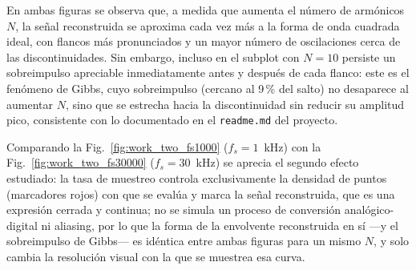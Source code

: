 En ambas figuras se observa que, a medida que aumenta el número de armónicos $N$, la señal reconstruida se aproxima cada vez más a la forma de onda cuadrada ideal, con flancos más pronunciados y un mayor número de oscilaciones cerca de las discontinuidades. Sin embargo, incluso en el subplot con $N = 10$ persiste un sobreimpulso apreciable inmediatamente antes y después de cada flanco: este es el fenómeno de Gibbs, cuyo sobreimpulso (cercano al 9\,\% del salto) no desaparece al aumentar $N$, sino que se estrecha hacia la discontinuidad sin reducir su amplitud pico, consistente con lo documentado en el \texttt{readme.md} del proyecto.

Comparando la Fig.~\ref{fig:work_two_fs1000} ($f_s = 1$~kHz) con la Fig.~\ref{fig:work_two_fs30000} ($f_s = 30$~kHz) se aprecia el segundo efecto estudiado: la tasa de muestreo controla exclusivamente la densidad de puntos (marcadores rojos) con que se evalúa y marca la señal reconstruida, que es una expresión cerrada y continua; no se simula un proceso de conversión analógico-digital ni aliasing, por lo que la forma de la envolvente reconstruida en sí —y el sobreimpulso de Gibbs— es idéntica entre ambas figuras para un mismo $N$, y solo cambia la resolución visual con la que se muestrea esa curva.
